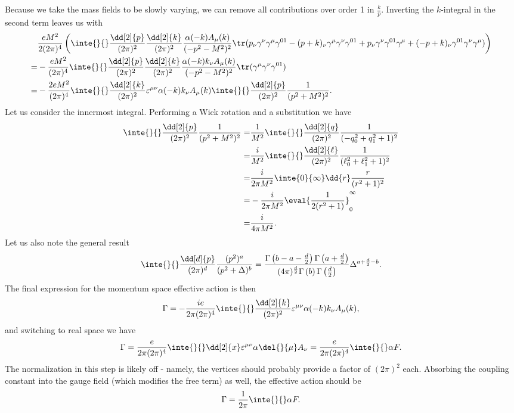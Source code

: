 Because we take the mass fields to be slowly varying, we can remove all contributions over order 1 in $\frac{k}{p}$. Inverting the $k$-integral in the second term leaves us with
\begin{align*}
	 &\frac{eM^{2}}{2(2\pi)^{4}}\left(\inte{}{}\frac{\dd[2]{p}}{(2\pi)^{2}}\frac{\dd[2]{k}}{(2\pi)^{2}}\frac{\alpha(-k)A_{\mu}(k)}{(-p^{2} - M^{2})^{2}}\tr(p_{\nu}\gamma^{\nu}\gamma^{\mu}\gamma^{01} - (p + k)_{\nu}\gamma^{\mu}\gamma^{\nu}\gamma^{01} + p_{\nu}\gamma^{\nu}\gamma^{01}\gamma^{\mu} + (-p + k)_{\nu}\gamma^{01}\gamma^{\nu}\gamma^{\mu})\right) \\
	=& -\frac{eM^{2}}{(2\pi)^{4}}\inte{}{}\frac{\dd[2]{p}}{(2\pi)^{2}}\frac{\dd[2]{k}}{(2\pi)^{2}}\frac{\alpha(-k)k_{\nu}A_{\mu}(k)}{(-p^{2} - M^{2})^{2}}\tr(\gamma^{\mu}\gamma^{\nu}\gamma^{01}) \\
	=& -\frac{2eM^{2}}{(2\pi)^{4}}\inte{}{}\frac{\dd[2]{k}}{(2\pi)^{2}}\varepsilon^{\mu\nu}\alpha(-k)k_{\nu}A_{\mu}(k)\inte{}{}\frac{\dd[2]{p}}{(2\pi)^{2}}\frac{1}{(p^{2} + M^{2})^{2}}.
\end{align*}
Let us consider the innermost integral. Performing a Wick rotation and a substitution we have
\begin{align*}
	\inte{}{}\frac{\dd[2]{p}}{(2\pi)^{2}}\frac{1}{(p^{2} + M^{2})^{2}} =& \frac{1}{M^{2}}\inte{}{}\frac{\dd[2]{q}}{(2\pi)^{2}}\frac{1}{(-q_{0}^{2} + q_{1}^{2} + 1)^{2}} \\
	=& \frac{i}{M^{2}}\inte{}{}\frac{\dd[2]{\ell}}{(2\pi)^{2}}\frac{1}{(\ell_{0}^{2} + \ell_{1}^{2} + 1)^{2}} \\
	=& \frac{i}{2\pi M^{2}}\inte{0}{\infty}\dd{r}\frac{r}{(r^{2} + 1)^{2}} \\
	=& -\frac{i}{2\pi M^{2}}\eval{\frac{1}{2(r^{2} + 1)}}_{0}^{\infty} \\
	=& \frac{i}{4\pi M^{2}}.
\end{align*}
Let us also note the general result
\begin{align*}
	\inte{}{}\frac{\dd[d]{p}}{(2\pi)^{d}}\frac{(p^{2})^{a}}{(p^{2} + \Delta)^{b}} = \frac{\Gamma\left(b - a - \frac{d}{2}\right)\Gamma\left(a + \frac{d}{2}\right)}{(4\pi)^{\frac{d}{2}}\Gamma\left(b\right)\Gamma\left(\frac{d}{2}\right)}\Delta^{a + \frac{d}{2} - b}.
\end{align*}
The final expression for the momentum space effective action is then
\begin{align*}
	\Gamma = -\frac{ie}{2\pi(2\pi)^{4}}\inte{}{}\frac{\dd[2]{k}}{(2\pi)^{2}}\varepsilon^{\mu\nu}\alpha(-k)k_{\nu}A_{\mu}(k),
\end{align*}
and switching to real space we have
\begin{align*}
	\Gamma = \frac{e}{2\pi(2\pi)^{4}}\inte{}{}\dd[2]{x}\varepsilon^{\mu\nu}\alpha\del{}{\mu}A_{\nu} = \frac{e}{2\pi(2\pi)^{4}}\inte{}{}\alpha F.
\end{align*}
The normalization in this step is likely off - namely, the vertices should probably provide a factor of $(2\pi)^{2}$ each. Absorbing the coupling constant into the gauge field (which modifies the free term) as well, the effective action should be
\begin{align*}
	\Gamma = \frac{1}{2\pi}\inte{}{}\alpha F.
\end{align*}

